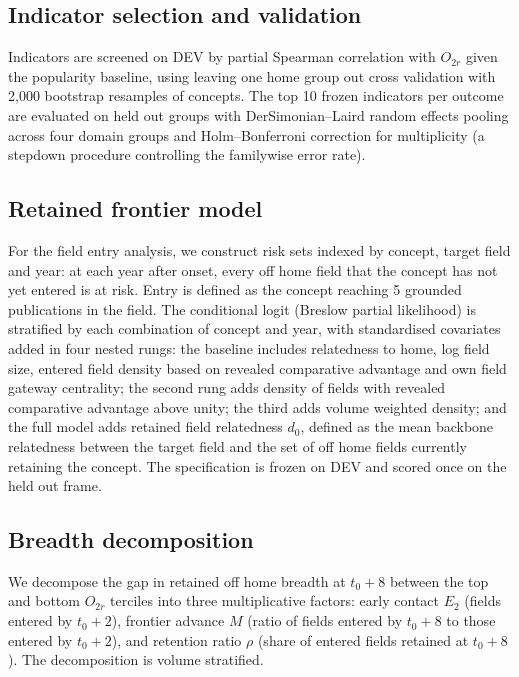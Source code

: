 \documentclass[11pt,letterpaper]{article}
\begin{document}
\subsection{Indicator selection and validation}

Indicators are screened on DEV by partial Spearman correlation with $O_{2r}$
given the popularity baseline, using leaving one home group out cross validation
with 2,000 bootstrap resamples of concepts. The top 10 frozen indicators per outcome
are evaluated on held out groups with DerSimonian--Laird random effects pooling
across four domain groups and Holm--Bonferroni correction for multiplicity (a
stepdown procedure controlling the familywise error rate).

\subsection{Retained frontier model}

For the field entry analysis, we construct risk sets indexed by concept, target
field and year: at each year after onset, every off home field that the concept
has not yet entered is at risk. Entry is defined as the concept reaching 5 grounded
publications in the field. The conditional logit (Breslow partial likelihood) is
stratified by each combination of concept and year, with standardised covariates
added in four nested
rungs: the baseline includes relatedness to home, log field size, entered field
density based on revealed comparative advantage and own field gateway centrality;
the second rung adds density of fields with revealed comparative advantage above
unity; the third adds volume weighted density; and the full model adds
retained field relatedness $d_0$, defined as the mean backbone relatedness
between the target field and the set of off home fields currently retaining the
concept. The specification is frozen on DEV and scored once on the held out
frame.

\subsection{Breadth decomposition}

We decompose the gap in retained off home breadth at $t_0 + 8$ between the top
and bottom $O_{2r}$ terciles into three multiplicative factors: early contact
$E_2$ (fields entered by $t_0 + 2$), frontier advance $M$ (ratio of fields
entered by $t_0 + 8$ to those entered by $t_0 + 2$), and retention ratio
$\rho$ (share of entered fields retained at $t_0 + 8$). The decomposition is
volume stratified.
\end{document}
